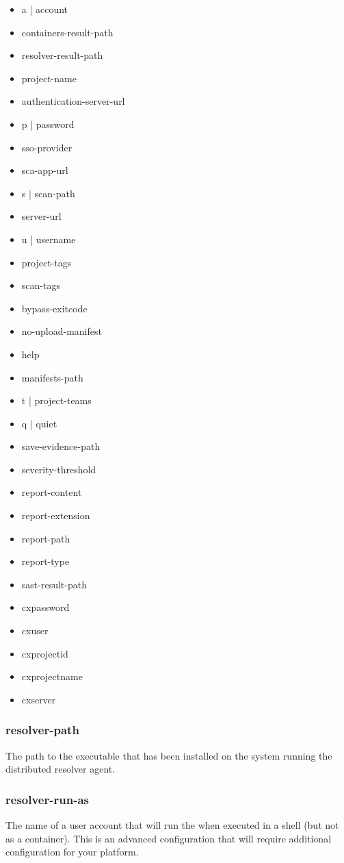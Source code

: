\begin{itemize}
  \item a | account
  \item containers-result-path
  \item resolver-result-path
  \item project-name
  \item authentication-server-url
  \item p | password
  \item sso-provider
  \item sca-app-url
  \item s | scan-path
  \item server-url
  \item u | username
  \item project-tags
  \item scan-tags
  \item bypass-exitcode
  \item no-upload-manifest
  \item help
  \item manifests-path
  \item t | project-teams
  \item q | quiet
  \item save-evidence-path
  \item severity-threshold
  \item report-content
  \item report-extension
  \item report-path
  \item report-type
  \item sast-result-path
  \item cxpassword
  \item cxuser
  \item cxprojectid
  \item cxprojectname
  \item cxserver
\end{itemize}

\subsubsection{resolver-path}\label{sec:agent-resolver-path}
The path to the \scaresolver executable that has been installed on the system running the distributed resolver agent.


\subsubsection{resolver-run-as}\label{sec:agent-resolver-run-as}
The name of a user account that will run the \scaresolver when executed in a shell (but not as a container).  This
is an advanced configuration that will require additional configuration for your platform.  

